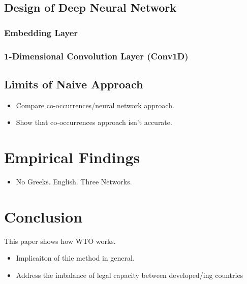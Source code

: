 \documentclass[12pt,letterpaper]{article}
\begin{document}
\subsection{Design of Deep Neural Network}
\subsubsection{Embedding Layer}


\subsubsection{1-Dimensional Convolution Layer (Conv1D)}





\subsection{Limits of Naive Approach}

\begin{itemize}
  \item Compare co-occurrences/neural network approach.

  \item Show that co-occurrences approach isn't accurate.
\end{itemize}


\section{Empirical Findings}

\begin{itemize}
  \item No Greeks. English. Three Networks.
\end{itemize}



\section{Conclusion}
This paper shows how WTO works.

\begin{itemize}
  \item Implicaiton of thie method in general.
  \item Address the imbalance of legal capacity between developed/ing countries
\end{itemize}
\end{document}
